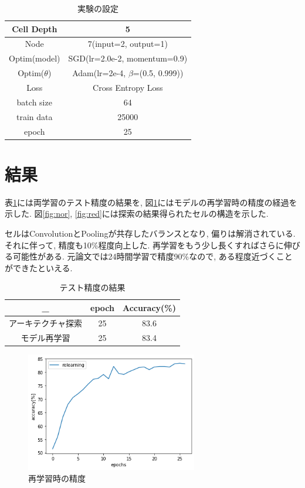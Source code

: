 \documentclass[twocolumn]{jarticle}     %
\begin{document}
\begin{table}[tb]
  \begin{center}
    \caption{実験の設定}
    \begin{tabular}{|c|c|} \hline
      Cell Depth & 5 \\ \hline
      Node & 7(input=2, output=1) \\ \hline
      Optim(model) & SGD(lr=2.0e-2, momentum=0.9) \\ \hline
      Optim($\theta$) & Adam(lr=2e-4, $\beta$=(0.5, 0.999)) \\ \hline
      Loss & Cross Entropy Loss \\ \hline
      batch size & 64 \\ \hline
      train data & 25000 \\ \hline
      epoch & 25 \\ \hline
    \end{tabular}
    \label{tab:setting}
  \end{center}
\end{table}

\section{結果}
表\ref{fig:acc}には両学習のテスト精度の結果を, 図\ref{fig:acc}にはモデルの再学習時の精度の経過を示した.
図\ref{fig:nor}, \ref{fig:red}には探索の結果得られたセルの構造を示した.

セルはConvolutionとPoolingが共存したバランスとなり, 偏りは解消されている.
それに伴って, 精度も10\%程度向上した. 再学習をもう少し長くすればさらに伸びる可能性がある.
元論文では24時間学習で精度90\%なので, ある程度近づくことができたといえる.

\begin{table}[tb]
  \begin{center}
    \caption{テスト精度の結果}
    \begin{tabular}{|c|c|c|} \hline
      _ & epoch & Accuracy(\%) \\ \hline
      アーキテクチャ探索 & 25 & 83.6 \\ \hline
      モデル再学習 & 25 & 83.4 \\ \hline
    \end{tabular}
    \label{tab:acc}
  \end{center}
\end{table}


\begin{figure}[tb]
	\begin{center}
		\includegraphics[clip,width=7.5cm]{acc.png}
		\caption{再学習時の精度}
		\label{fig:acc}
	\end{center}
\end{figure}
\end{document}
